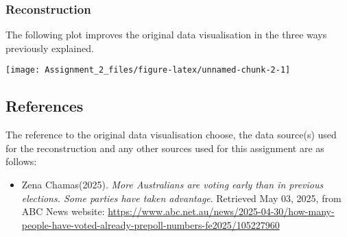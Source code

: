 \documentclass[
]{article}
\providecommand{\tightlist}{%
  \setlength{\itemsep}{0pt}\setlength{\parskip}{0pt}}
\begin{document}
\subsubsection{Reconstruction}\label{reconstruction}

The following plot improves the original data visualisation in the three
ways previously explained.

\begin{center}\texttt{[image: Assignment\_2\_files/figure-latex/unnamed-chunk-2-1]} \end{center}

\subsection{References}\label{references}

The reference to the original data visualisation choose, the data
source(s) used for the reconstruction and any other sources used for
this assignment are as follows:

\begin{itemize}
\tightlist
\item
  Zena Chamas(2025). \emph{More Australians are voting early than in
  previous elections. Some parties have taken advantage}. Retrieved May
  03, 2025, from ABC News website:
  \url{https://www.abc.net.au/news/2025-04-30/how-many-people-have-voted-already-prepoll-numbers-fe2025/105227960}
\end{itemize}
\end{document}
